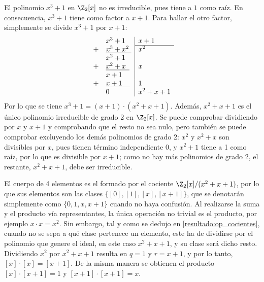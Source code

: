     \begin{ejs}
    
        \item El polinomio $x^3 + 1$ en $\Z_2[x]$ no es irreducible, pues tiene a $1$ como raíz. En consecuencia, $x^3 + 1$ tiene como factor a $x+1$. Para hallar el otro factor, simplemente se divide $x^3 + 1$ por $x+1$: 
            \[
            \begin{array}{rl|l}
                &x^3 + 1 & x + 1 \\\cline{3-3} 
                + & \underline{x^3 + x^2\phantom{l}} & x^2\\
                 &x^2 + 1 &  \\
                + &\underline{x^2+x\phantom{  1}} &x\\
                 &x + 1 &  \\
                + &\underline{x + 1\phantom{ n 1}} &1\\
                &0& x^2 + x +1 \\
            \end{array}
            \]
        Por lo que se tiene $x^3 + 1 = (x+1)\cdot(x^2+x+1)$. Además, $x^2+x+1$ es el único polinomio irreducible de grado 2 en $\Z_2[x]$. Se puede comprobar dividiendo por $x$ y $x+1$ y comprobando que el resto no sea nulo, pero también se puede comprobar excluyendo los demás polinomios de grado 2: $x^2$ y $x^2 + x$ son divisibles por $x$, pues tienen término independiente 0, y $x^2 + 1$ tiene a 1 como raíz, por lo que es divisible por $x+1$; como no hay más polinomios de grado 2, el restante, $x^2+x+1$, debe ser irreducible.
        
        \item El cuerpo de 4 elementos es el formado por el cociente $\Z_2[x]/(x^2+x+1)$, por lo que sus elementos son las clases $\{[0],[1],[x],[x+1]\}$, que se denotarán simplemente como $\{0,1,x,x+1\}$ cuando no haya confusión. Al realizarse la suma y el producto vía representantes, la única operación no trivial es el producto, por ejemplo $x\cdot x = x^2$. Sin embargo, tal y como se dedujo en \ref{resultado:op_cocientes}, cuando no se sepa a qué clase pertenece un elemento, este ha de dividirse por el polinomio que genere el ideal, en este caso $x^2+x+1$, y su clase será dicho resto. Dividiendo $x^2$ por $x^2+x+1$ resulta en $q = 1$ y $r = x + 1$, y por lo tanto, $[x]\cdot[x] = [x+1]$. De la misma manera se obtienen el producto $[x]\cdot[x+1] = 1$ y $[x+1]\cdot[x+1] = x$.


\end{ejs}
